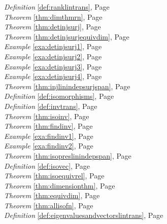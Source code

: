 \begin{multicols}{3}
\begin{center}
      \textit{Definition} \ref{def:ranklintrans}, Page \pageref{def:ranklintrans} \\
      \textit{Theorem} \ref{thm:dimthmrn}, Page \pageref{thm:dimthmrn} \\
      \textit{Theorem} \ref{thm:detinjsurj}, Page \pageref{thm:detinjsurj} \\
      \textit{Theorem} \ref{thm:detinjsurjequivdim}, Page \pageref{thm:detinjsurjequivdim} \\
      \textit{Example} \ref{exa:detinjsurj1}, Page \pageref{exa:detinjsurj1} \\
      \textit{Example} \ref{exa:detinjsurj2}, Page \pageref{exa:detinjsurj2} \\
      \textit{Example} \ref{exa:detinjsurj3}, Page \pageref{exa:detinjsurj3} \\
      \textit{Example} \ref{exa:detinjsurj4}, Page \pageref{exa:detinjsurj4} \\
      \textit{Theorem} \ref{thm:injlinindepsurjspan}, Page \pageref{thm:injlinindepsurjspan} \\
      \textit{Definition} \ref{def:isomorphisms}, Page \pageref{def:isomorphisms} \\
      \textit{Definition} \ref{def:invtrans}, Page \pageref{def:invtrans} \\
      \textit{Theorem} \ref{thm:isoinv}, Page \pageref{thm:isoinv} \\
      \textit{Theorem} \ref{thm:findinv}, Page \pageref{thm:findinv} \\
      \textit{Example} \ref{exa:findinv1}, Page \pageref{exa:findinv1} \\
      \textit{Example} \ref{exa:findinv2}, Page \pageref{exa:findinv2} \\
      \textit{Theorem} \ref{thm:isopreslinindepspan}, Page \pageref{thm:isopreslinindepspan} \\
      \textit{Definition} \ref{def:isovec}, Page \pageref{def:isovec} \\
      \textit{Theorem} \ref{thm:isoequivrel}, Page \pageref{thm:isoequivrel} \\
      \textit{Theorem} \ref{thm:dimensionthm}, Page \pageref{thm:dimensionthm} \\
      \textit{Theorem} \ref{thm:equivdim}, Page \pageref{thm:equivdim} \\
      \textit{Theorem} \ref{thm:allisofn}, Page \pageref{thm:allisofn} \\
      \textit{Definition} \ref{def:eigenvaluesandvectorslintrans}, Page \pageref{def:eigenvaluesandvectorslintrans} \\

\end{center}
\end{multicols}
